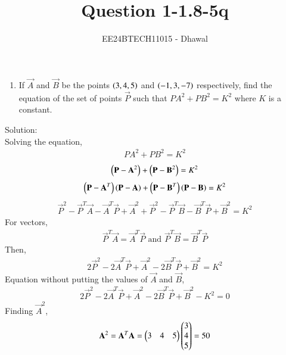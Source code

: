 \documentclass[journal]{IEEEtran}
\numberwithin{equation}{enumi}
\numberwithin{figure}{enumi}
\begin{document}

\title{Question 1-1.8-5q}
\author{EE24BTECH11015 - Dhawal}
{\let\newpage\relax\maketitle}
\begin{enumerate}
	\item If $\vec{A}$ and $\vec{B}$ be the points $\left(3,4,5\right)$ and $\left(-1,3,-7\right)$ respectively, find the equation of the set of points $\vec{P}$ such that ${PA}^2+{PB}^2=K^2$ where $K$ is a constant.
\end{enumerate}
Solution:\\
Solving the equation,
\begin{align}
        {PA}^2+{PB}^2=K^2
        \end{align}
        \begin{align}
        \left({\mathbf{P}-\mathbf{A}}^2\right)+\left({\mathbf{P}-\mathbf{B}}^2\right)=K^2
        \end{align}
        \begin{align}
        \left({\mathbf{P}-\mathbf{A}}^{T}\right)\left(\mathbf{P}-\mathbf{A}\right)+\left({\mathbf{P}-\mathbf{B}}^{T}\right)\left(\mathbf{P}-\mathbf{B}\right)=K^2
        \end{align}
        \begin{align}
        \vec{P}^2 -\vec{P}^{T}\vec{A}-\vec{A}^{T}\vec{P}+\vec{A}^2+\vec{P}^2-\vec{P}^{T}\vec{B}-\vec{B}^{T}\vec{P}+\vec{B}^2=K^2
\end{align}
For vectors,
\begin{align}
	\vec{P}^{T}\vec{A}=\vec{A}^{T}\vec{P} \text{ and } \vec{P}^{T}\vec{B}=\vec{B}^{T}\vec{P}
\end{align}
Then,
\begin{align}
	2\vec{P}^2 -2\vec{A}^{T}\vec{P}+\vec{A}^2-2\vec{B}^{T}\vec{P}+\vec{B}^2=K^2
\end{align}
Equation without putting the values of $\vec{A}$ and $\vec{B}$,
\begin{align}
	2\vec{P}^2 -2\vec{A}^{T}\vec{P}+\vec{A}^2-2\vec{B}^{T}\vec{P}+\vec{B}^2-K^2=0
\end{align}
Finding $\vec{A}^2$,
\begin{align}
\mathbf{A}^2=\mathbf{A}^T\mathbf{A}=\begin{pmatrix}3&4&5\end{pmatrix}\begin{pmatrix}3\\4\\5\end{pmatrix}=50
\end{align}
\end{document}
